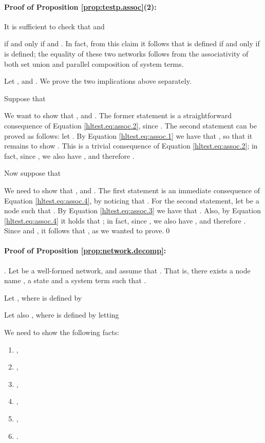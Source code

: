 \documentclass{LMCS}
\begin{document}
\paragraph{\textbf{Proof of Proposition \ref{prop:testp.assoc}(2)}:}
\label{proof:testP.assoc}

It is sufficient to check that 
 and 
 
if and only if  and 
.
In fact, from this claim it follows that  is 
defined if and only if  is defined; the 
equality of these two networks follows from the associativity of both set 
union and parallel composition of system terms.

Let , 
 and . We prove the two implications above separately.

Suppose that 

We want to show that , and 
. The former 
statement is a straightforward consequence of Equation \eqref{hltest.eq:assoc.2}, 
since .
The second statement can be proved as follows: let . By Equation 
\eqref{hltest.eq:assoc.1} we have that , so that 
it remains to show . This is a trivial consequence 
of Equation \eqref{hltest.eq:assoc.2}; in fact, since , we 
also have , and therefore .

Now suppose that 

We need to show that , and 
. The first statement is 
an immediate consequence of Equation \eqref{hltest.eq:assoc.4}, by noticing 
that . 
For the second 
statement, let  be a node such that . By Equation 
\eqref{hltest.eq:assoc.3} we have that . Also, 
by Equation \eqref{hltest.eq:assoc.4} it holds that ; 
in fact, since , we also have , and therefore . 
Since  and , it follows that 
, as we wanted to prove.\hfill\qed

\paragraph{\textbf{Proof of Proposition \ref{prop:network.decomp}:}}
\label{proof:generators}.
Let  be a well-formed network, and assume that 
. That is, there exists a node name , a state  
and a system term  such that  . 

Let , where 
 is defined by 


Let also , where  is defined by letting 


We need to show the following facts:
\begin{enumerate}
\item \label{generators.1} ,
\item \label{generators.2} , 
\item \label{generators.3} ,
\item \label{generators.4} ,
\item \label{generators.5} ,
\item \label{generators.6} .
\end{enumerate}
\end{document}

